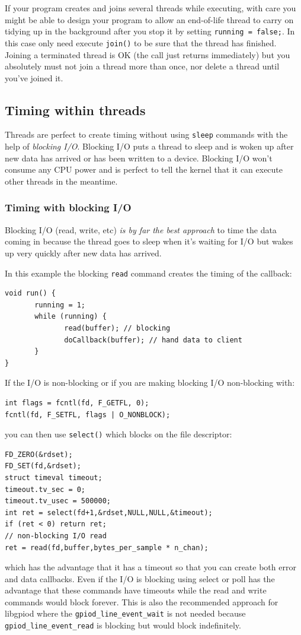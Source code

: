 \documentclass[12pt]{report}
\begin{document}
If your program creates and joins several threads while executing,
with care you might be able to design your program to allow an
end-of-life thread to carry on
tidying up in the background after you stop it by setting \texttt{running = false;}.
In this case only need execute \texttt{join()} to be sure that
the thread has finished. Joining a terminated thread is OK
(the call just returns immediately)
but you absolutely must not join a thread more than once,
nor delete a thread until you've joined it.


\subsection{Timing within threads}
Threads are perfect to create timing without using \texttt{sleep} commands
with the help of \textsl{blocking I/O}. 
Blocking I/O puts a thread
to sleep and is woken up after new data has arrived or has been
written to a device. Blocking I/O won't consume any CPU power
and is perfect to tell the kernel that it can execute other threads
in the meantime.


\subsubsection{Timing with blocking I/O}
Blocking I/O (read, write, etc) \textsl{is by far the best approach} to time
the data coming in because the thread goes to sleep when it's waiting for
I/O but wakes up very quickly after new data has arrived.

In this example the blocking \texttt{read} command creates
the timing of the callback:
\begin{verbatim}
void run() {
       running = 1;
       while (running) {
              read(buffer); // blocking
              doCallback(buffer); // hand data to client
       }
}
\end{verbatim}
If the I/O is non-blocking or if you are making blocking I/O non-blocking with:
\begin{verbatim}
int flags = fcntl(fd, F_GETFL, 0);
fcntl(fd, F_SETFL, flags | O_NONBLOCK);
\end{verbatim}
you can then use \texttt{select()} which blocks on the file descriptor:
\begin{verbatim}
FD_ZERO(&rdset);
FD_SET(fd,&rdset);
struct timeval timeout;
timeout.tv_sec = 0;
timeout.tv_usec = 500000;
int ret = select(fd+1,&rdset,NULL,NULL,&timeout);
if (ret < 0) return ret;
// non-blocking I/O read
ret = read(fd,buffer,bytes_per_sample * n_chan);
\end{verbatim}
which has the advantage that it has a timeout so that
you can create both error and data
callbacks. Even if the I/O is blocking using select or poll
has the advantage that these commands have timeouts while
the read and write commands would block forever. This is also
the recommended approach for libgpiod where the \texttt{gpiod\_line\_event\_wait}
is not needed because \texttt{gpiod\_line\_event\_read} is blocking
but would block indefinitely.
\end{document}
